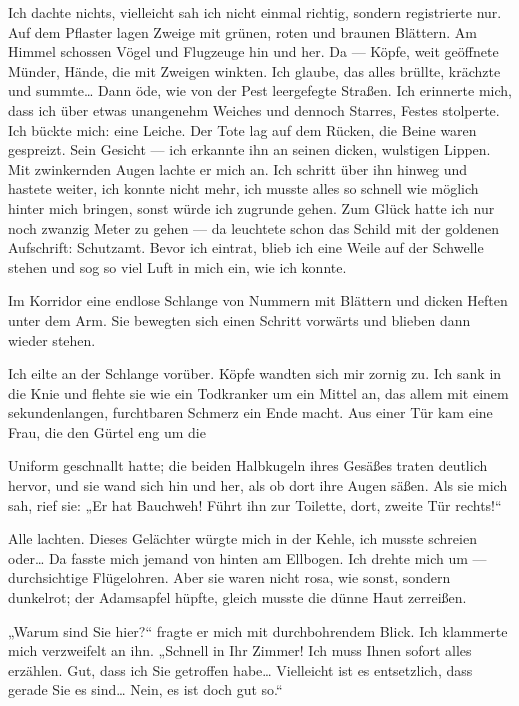 Ich dachte nichts, vielleicht sah ich nicht einmal richtig, sondern
registrierte nur. Auf dem Pflaster lagen Zweige mit grünen, roten
und braunen Blättern. Am Himmel schossen Vögel und Flugzeuge hin
und her. Da — Köpfe, weit geöffnete Münder, Hände, die mit Zweigen
winkten. Ich glaube, das alles brüllte, krächzte und summte\ldots{} Dann
öde, wie von der Pest leergefegte Straßen. Ich erinnerte mich, dass
ich über etwas unangenehm Weiches und dennoch Starres, Festes
stolperte. Ich bückte mich: eine Leiche. Der Tote lag auf dem
Rücken, die Beine waren gespreizt. Sein Gesicht — ich erkannte ihn
an seinen dicken, wulstigen Lippen. Mit zwinkernden Augen lachte er
mich an. Ich schritt über ihn hinweg und hastete weiter, ich konnte
nicht mehr, ich musste alles so schnell wie möglich hinter mich
bringen, sonst würde ich zugrunde gehen. Zum Glück hatte ich nur
noch zwanzig Meter zu gehen — da leuchtete schon das Schild mit der
goldenen Aufschrift: Schutzamt. Bevor ich eintrat, blieb ich eine
Weile auf der Schwelle stehen und sog so viel Luft in mich ein, wie
ich konnte.

Im Korridor eine endlose Schlange von Nummern mit Blättern und
dicken Heften unter dem Arm. Sie bewegten sich einen Schritt
vorwärts und blieben dann wieder stehen.

Ich eilte an der Schlange vorüber. Köpfe wandten sich mir zornig
zu. Ich sank in die Knie und flehte sie wie ein Todkranker um ein
Mittel an, das allem mit einem sekundenlangen, furchtbaren Schmerz
ein Ende macht. Aus einer Tür kam eine Frau, die den Gürtel eng um
die

Uniform geschnallt hatte; die beiden Halbkugeln ihres Gesäßes
traten deutlich hervor, und sie wand sich hin und her, als ob dort
ihre Augen säßen. Als sie mich sah, rief sie: „Er hat Bauchweh!
Führt ihn zur Toilette, dort, zweite Tür rechts!“

Alle lachten. Dieses Gelächter würgte mich in der Kehle, ich musste
schreien oder\ldots{} Da fasste mich jemand von hinten am Ellbogen. Ich
drehte mich um — durchsichtige Flügelohren. Aber sie waren nicht
rosa, wie sonst, sondern dunkelrot; der Adamsapfel hüpfte, gleich
musste die dünne Haut zerreißen.

„Warum sind Sie hier?“ fragte er mich mit durchbohrendem Blick. Ich
klammerte mich verzweifelt an ihn. „Schnell in Ihr Zimmer! Ich muss
Ihnen sofort alles erzählen. Gut, dass ich Sie getroffen habe\ldots{}
Vielleicht ist es entsetzlich, dass gerade Sie es sind\ldots{} Nein, es
ist doch gut so.“

